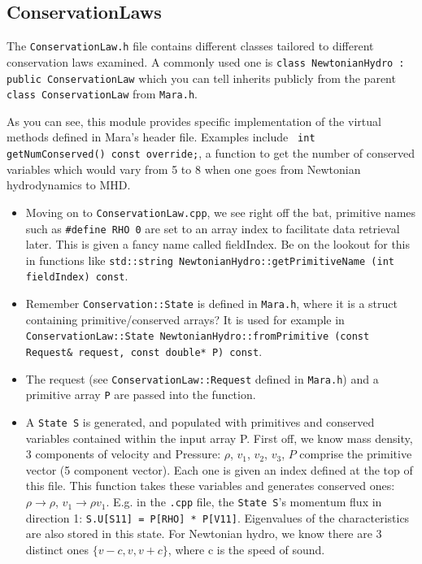 \documentclass{article}
\begin{document}
\subsection{ConservationLaws}
The \texttt{ConservationLaw.h} file contains different classes tailored to different conservation laws examined. A commonly used one is \texttt{class NewtonianHydro : public ConservationLaw} which you can tell inherits publicly from the parent \texttt{class ConservationLaw} from \texttt{Mara.h}. 

As you can see, this module provides specific implementation of the virtual methods defined in Mara's header file. Examples include \texttt{  int getNumConserved() const override;}, a function to get the number of conserved variables which would vary from 5 to 8 when one goes from Newtonian hydrodynamics to MHD. 
\begin{itemize}
\item Moving on to \texttt{ConservationLaw.cpp}, we see right off the bat, primitive names such as \texttt{\#define RHO 0} are set to an array index to facilitate data retrieval later. This is given a fancy name called fieldIndex. Be on the lookout for this in functions like \texttt{std::string NewtonianHydro::getPrimitiveName (int fieldIndex) const}.

\item Remember \texttt{Conservation::State} is defined in \texttt{Mara.h}, where it is a struct containing primitive/conserved arrays? It is used for example in \texttt{ConservationLaw::State NewtonianHydro::fromPrimitive (const Request\& request, const double* P) const}. 

\item The request (see \texttt{ConservationLaw::Request} defined in \texttt{Mara.h}) and a primitive array \texttt{P} are passed into the function. 

\item A \texttt{State S} is generated, and populated with primitives and conserved variables contained within the input array P. First off, we know mass density, 3 components of velocity and Pressure: $\rho$, $v_1$, $v_2$, $v_3$, $P$ comprise the primitive vector (5 component vector). Each one is given an index defined at the top of this file. This function takes these variables and generates conserved ones: $\rho \rightarrow \rho$, $v_1 \rightarrow	\rho v_1$. E.g. in the \texttt{.cpp} file, the \texttt{State S}'s momentum flux in direction 1: \texttt{S.U[S11] = P[RHO] * P[V11]}. Eigenvalues of the characteristics are also stored in this state. For Newtonian hydro, we know there are 3 distinct ones $\{v-c,v,v+c\}$, where c is the speed of sound.


\end{itemize}
\end{document}
